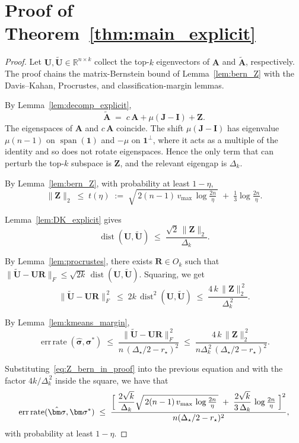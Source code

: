 \documentclass[11pt]{article}
\theoremstyle{plain}
\theoremstyle{definition}
\theoremstyle{remark}
\begin{document}
\section{Proof of Theorem~\ref{thm:main_explicit}}

\begin{proof}
Let $\mathbf{U},\widetilde{\mathbf{U}}\in\mathbb{R}^{n\times k}$ collect the top-$k$ eigenvectors of $\mathbf{A}$ and $\widetilde{\mathbf{A}}$, respectively. The proof chains the matrix-Bernstein bound of Lemma~\ref{lem:bern_Z} with the Davis–Kahan, Procrustes, and classification-margin lemmas.

By Lemma~\ref{lem:decomp_explicit},
\[
\widetilde{\mathbf{A}} \;=\; c\,\mathbf{A}+\mu(\mathbf{J}-\mathbf{I})+\mathbf{Z}.
\]
The eigenspaces of $\mathbf{A}$ and $c\,\mathbf{A}$ coincide. The shift $\mu(\mathbf{J}-\mathbf{I})$ has eigenvalue $\mu(n-1)$ on $\operatorname{span}(\mathbf{1})$ and $-\mu$ on $\mathbf{1}^{\perp}$, where it acts as a multiple of the identity and so does not rotate eigenspaces. Hence the only term that can perturb the top-$k$ subspace is $\mathbf{Z}$, and the relevant eigengap is $\Delta_k$.

By Lemma~\ref{lem:bern_Z}, with probability at least $1-\eta$,
\begin{equation}\label{eq:Z_bern_in_proof}
\|\mathbf{Z}\|_2 \;\le\; t(\eta) \;:=\; \sqrt{\,2(n-1)\,v_{\max}\,\log\tfrac{2n}{\eta}\,} \;+\; \tfrac{1}{3}\log\tfrac{2n}{\eta}.
\end{equation}


Lemma~\ref{lem:DK_explicit} gives
\[
\operatorname{dist}(\mathbf{U},\widetilde{\mathbf{U}}) \;\le\; \frac{\sqrt 2\,\|\mathbf{Z}\|_2}{\Delta_k}.
\]

By Lemma~\ref{lem:procrustes}, there exists $\mathbf{R}\in O_k$ such that $\|\widetilde{\mathbf{U}}-\mathbf{U}\mathbf{R}\|_F \le \sqrt{2k}\,\operatorname{dist}(\mathbf{U},\widetilde{\mathbf{U}})$. Squaring, we get
\[
\|\widetilde{\mathbf{U}}-\mathbf{U}\mathbf{R}\|_F^{\,2}
\;\le\; 2 k\,\operatorname{dist}^{2}(\mathbf{U},\widetilde{\mathbf{U}})
\;\le\; \frac{4\,k\,\|\mathbf{Z}\|_2^{\,2}}{\Delta_k^{\,2}}.
\]

By Lemma~\ref{lem:kmeans_margin},
\[
\operatorname{err\,rate}(\hat{\bm\sigma},\bm\sigma^{*})
\;\le\; \frac{\|\widetilde{\mathbf{U}}-\mathbf{U}\mathbf{R}\|_F^{\,2}}{n\,(\Delta_{\star}/2-r_{\star})^{2}}
\;\le\; \frac{4\,k\,\|\mathbf{Z}\|_2^{\,2}}{n \Delta_k^{\,2}\,(\Delta_{\star}/2-r_{\star})^{2}}.
\]

Substituting~\eqref{eq:Z_bern_in_proof} into the previous equation and with the factor $4k/\Delta_k^{\,2}$ inside the square,
we have that
\[
\operatorname{err\,rate}(\hat{\bm\sigma},\bm\sigma^{*})
\;\le\;
\frac{\Bigl[\;\dfrac{2\sqrt{k}}{\Delta_k}\sqrt{\,2(n-1)\,v_{\max}\,\log\tfrac{2n}{\eta}\,}
\;+\;\dfrac{2\sqrt{k}}{3\,\Delta_k}\,\log\tfrac{2n}{\eta}\;\Bigr]^{2}}
{n (\Delta_{\star}/2-r_{\star})^{2}},
\]
with probability at least $1-\eta$.
\end{proof}
\end{document}
